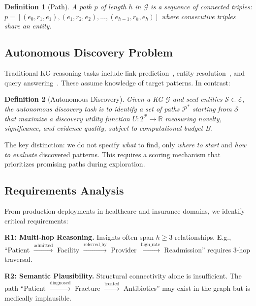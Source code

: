 \documentclass[10pt,twocolumn]{article}
\newtheorem{definition}{Definition}
\begin{document}
\begin{definition}[Path]
A path $p$ of length $h$ in $\mathcal{G}$ is a sequence of connected triples: $p = [(e_0, r_1, e_1), (e_1, r_2, e_2), \ldots, (e_{h-1}, r_h, e_h)]$ where consecutive triples share an entity.
\end{definition}

\subsection{Autonomous Discovery Problem}

Traditional KG reasoning tasks include link prediction~\cite{bordes2013translating}, entity resolution~\cite{shen2015entity}, and query answering~\cite{hamilton2018embedding}. These assume knowledge of target patterns. In contrast:

\begin{definition}[Autonomous Discovery]
Given a KG $\mathcal{G}$ and seed entities $\mathcal{S} \subset \mathcal{E}$, the autonomous discovery task is to identify a set of paths $\mathcal{P}^*$ starting from $\mathcal{S}$ that maximize a discovery utility function $U: 2^{\mathcal{P}} \rightarrow \mathbb{R}$ measuring novelty, significance, and evidence quality, subject to computational budget $B$.
\end{definition}

The key distinction: we do not specify \textit{what} to find, only \textit{where to start} and \textit{how to evaluate} discovered patterns. This requires a scoring mechanism that prioritizes promising paths during exploration.

\subsection{Requirements Analysis}

From production deployments in healthcare and insurance domains, we identify critical requirements:

\textbf{R1: Multi-hop Reasoning.} Insights often span $h \geq 3$ relationships. E.g., ``Patient $\xrightarrow{\text{admitted}}$ Facility $\xrightarrow{\text{referred\_by}}$ Provider $\xrightarrow{\text{high\_rate}}$ Readmission'' requires 3-hop traversal.

\textbf{R2: Semantic Plausibility.} Structural connectivity alone is insufficient. The path ``Patient $\xrightarrow{\text{diagnosed}}$ Fracture $\xrightarrow{\text{treated}}$ Antibiotics'' may exist in the graph but is medically implausible.
\end{document}
